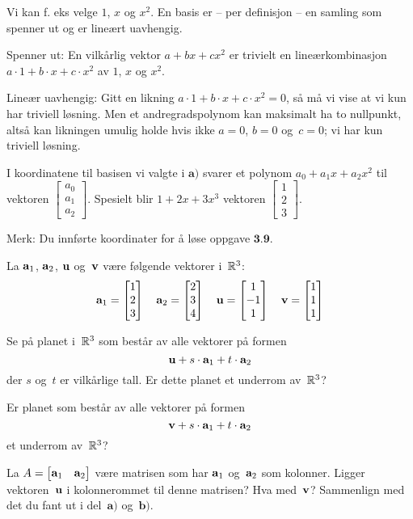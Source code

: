 \begin{losning}


\begin{punkt}
Vi kan f. eks velge $1$, $x$ og $x^2$. En basis er -- per definisjon -- en samling som spenner ut og er lineært uavhengig.

\noindent
Spenner ut: En vilkårlig vektor $a+bx+cx^2$ er trivielt en lineærkombinasjon $a\cdot 1+b\cdot x+c\cdot x^2$ av $1$, $x$ og $x^2$.

\noindent
Lineær uavhengig: Gitt en likning $a\cdot 1+b\cdot x+c\cdot x^2=0$, så må vi vise at vi kun har triviell løsning. Men et andregradspolynom kan maksimalt ha to nullpunkt, altså kan likningen umulig holde hvis ikke $a=0$, $b=0$ og~$c=0$; vi har kun triviell løsning.
\end{punkt}


\begin{punkt}
I koordinatene til basisen vi valgte i $\textbf{a)}$ svarer et polynom $a_0+a_1x+a_2x^2$ til vektoren $\begin{bmatrix}
a_0\\
a_1\\
a_2
\end{bmatrix}.$ Spesielt blir $1+2x+3x^3$ vektoren $\begin{bmatrix}
1\\
2\\
3
\end{bmatrix}.$


\noindent
Merk: Du innførte koordinater for å løse oppgave $\textbf{3.9.}$
\end{punkt}

\end{losning}


\begin{oppgave}
La $\mathbf{a}_1$, $\mathbf{a}_2$, $\mathbf{u}$ og~$\mathbf{v}$ være følgende vektorer i~$\mathbb{R}^3$:
\[
\mathbf{a}_1 = \begin{bmatrix} 1 \\ 2 \\ 3 \end{bmatrix}
\quad
\mathbf{a}_2 = \begin{bmatrix} 2 \\ 3 \\ 4 \end{bmatrix}
\quad
\mathbf{u} = \begin{bmatrix} 1 \\ -1 \\ 1 \end{bmatrix}
\quad
\mathbf{v} = \begin{bmatrix} 1 \\ 1 \\ 1 \end{bmatrix}
\]
\begin{punkt}
Se på planet i~$\mathbb{R}^3$ som består av alle vektorer på formen
\[
\mathbf{u} + s \cdot \mathbf{a}_1 + t \cdot \mathbf{a}_2
\]
der $s$ og~$t$ er vilkårlige tall.  Er dette planet et underrom
av~$\mathbb{R}^3$?
\end{punkt}
\begin{punkt}
Er planet som består av alle vektorer på formen
\[
\mathbf{v} + s \cdot \mathbf{a}_1 + t \cdot \mathbf{a}_2
\]
et underrom av~$\mathbb{R}^3$?
\end{punkt}
\begin{punkt}
La $A = \begin{bmatrix} \mathbf{a}_1 & \mathbf{a}_2 \end{bmatrix}$
være matrisen som har $\mathbf{a}_1$ og~$\mathbf{a}_2$ som kolonner.
Ligger vektoren~$\mathbf{u}$ i kolonnerommet til denne matrisen?
Hva med~$\mathbf{v}$?
Sammenlign med det du fant ut i del~$\textbf{a)}$ og~$\textbf{b)}$.
\end{punkt}
\end{oppgave}

